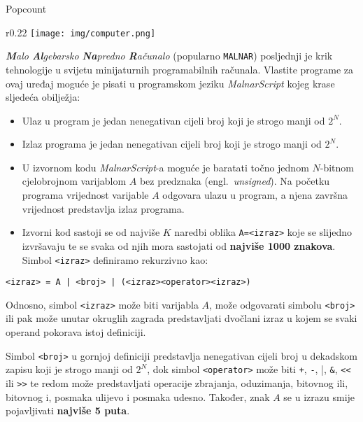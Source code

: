 \begin{statement}[
  problempoints=110,
  timelimit=1 sekunda,
  memorylimit=512 MiB,
]{Popcount}

\setlength\intextsep{-0.1cm}
\begin{wrapfigure}[3]{r}{0.22\textwidth}
\centering
\texttt{[image: img/computer.png]}
\end{wrapfigure}

\textit{\textbf{M}alo \textbf{Al}gebarsko \textbf{Na}predno \textbf{R}ačunalo}
(popularno \texttt{MALNAR}) posljednji je krik tehnologije u svijetu
minijaturnih programabilnih računala. Vlastite programe za ovaj uređaj moguće
je pisati u programskom jeziku \textit{MalnarScript} kojeg krase sljedeća
obilježja:

\begin{itemize}[topsep=0pt]
   \item Ulaz u program je jedan nenegativan cijeli broj koji je strogo manji
         od $2^N$.
   \item Izlaz programa je jedan nenegativan cijeli broj koji je strogo manji
         od $2^N$.
   \item U izvornom kodu \textit{MalnarScript}-a moguće je baratati točno
         jednom $N$-bitnom cjelobrojnom  varijablom $A$ bez predznaka (engl.\
         \textit{unsigned}). Na početku programa vrijednost varijable $A$
         odgovara ulazu u program, a njena završna vrijednost predstavlja izlaz
         programa.
   \item Izvorni kod sastoji se od najviše $K$ naredbi oblika \texttt{A=<izraz>}
         koje se slijedno izvršavaju te se svaka od njih mora sastojati od
         \textbf{najviše 1000 znakova}. Simbol \texttt{<izraz>} definiramo
         rekurzivno kao:
\end{itemize}

\begin{center}
  \texttt{<izraz> = A | <broj> | (<izraz><operator><izraz>)}
\end{center}

Odnosno, simbol \texttt{<izraz>} može biti varijabla $A$, može odgovarati
simbolu \texttt{<broj>} ili pak može unutar okruglih zagrada predstavljati
dvočlani izraz u kojem se svaki operand pokorava istoj definiciji.

Simbol \texttt{<broj>} u gornjoj definiciji predstavlja nenegativan cijeli broj
u dekadskom zapisu koji je strogo manji od $2^N$, dok simbol
\verb|<operator>| može biti \verb|+|, \verb|-|, \verb|||,
\verb|&|, \verb|<<| ili \verb|>>| te redom može predstavljati
operacije zbrajanja, oduzimanja, bitovnog ili, bitovnog i, posmaka ulijevo i
posmaka udesno.  Također, znak $A$ se u izrazu smije pojavljivati
\textbf{najviše 5 puta}.


\end{statement}
